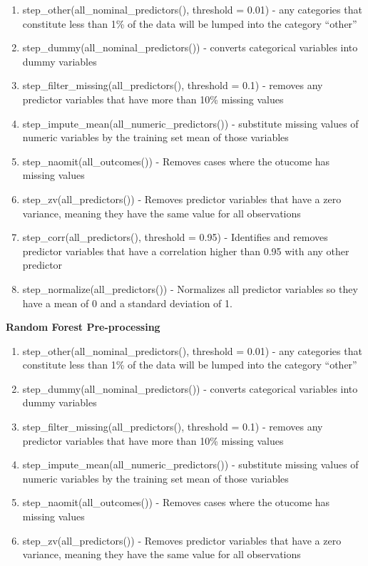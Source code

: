\documentclass[sn-basic,pdflatex]{sn-jnl}
\begin{document}
\begin{enumerate}
\def\labelenumi{\arabic{enumi}.}
\item
  step\_other(all\_nominal\_predictors(), threshold = 0.01) - any
  categories that constitute less than 1\% of the data will be lumped
  into the category ``other''
\item
  step\_dummy(all\_nominal\_predictors()) - converts categorical
  variables into dummy variables
\item
  step\_filter\_missing(all\_predictors(), threshold = 0.1) - removes
  any predictor variables that have more than 10\% missing values
\item
  step\_impute\_mean(all\_numeric\_predictors()) - substitute missing
  values of numeric variables by the training set mean of those
  variables
\item
  step\_naomit(all\_outcomes()) - Removes cases where the otucome has
  missing values
\item
  step\_zv(all\_predictors()) - Removes predictor variables that have a
  zero variance, meaning they have the same value for all observations
\item
  step\_corr(all\_predictors(), threshold = 0.95) - Identifies and
  removes predictor variables that have a correlation higher than 0.95
  with any other predictor
\item
  step\_normalize(all\_predictors()) - Normalizes all predictor
  variables so they have a mean of 0 and a standard deviation of 1.
\end{enumerate}

\textbf{Random Forest Pre-processing}

\begin{enumerate}
\def\labelenumi{\arabic{enumi}.}
\item
  step\_other(all\_nominal\_predictors(), threshold = 0.01) - any
  categories that constitute less than 1\% of the data will be lumped
  into the category ``other''
\item
  step\_dummy(all\_nominal\_predictors()) - converts categorical
  variables into dummy variables
\item
  step\_filter\_missing(all\_predictors(), threshold = 0.1) - removes
  any predictor variables that have more than 10\% missing values
\item
  step\_impute\_mean(all\_numeric\_predictors()) - substitute missing
  values of numeric variables by the training set mean of those
  variables
\item
  step\_naomit(all\_outcomes()) - Removes cases where the otucome has
  missing values
\item
  step\_zv(all\_predictors()) - Removes predictor variables that have a
  zero variance, meaning they have the same value for all observations
\end{enumerate}
\end{document}
